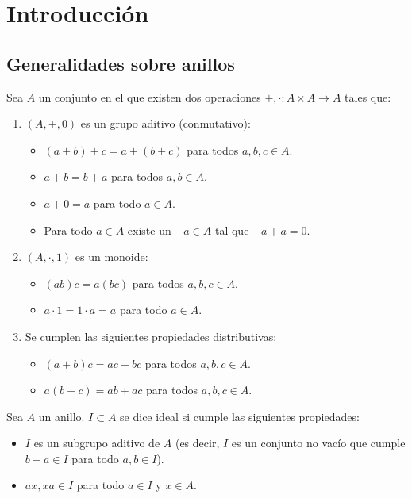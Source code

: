 \section{Introducción}
\subsection{Generalidades sobre anillos}
\begin{df}[Anillo]
  Sea \(A\) un conjunto en el que existen dos operaciones
  \(+,\cdot:A\times A\longrightarrow A\) tales que:
  \begin{enumerate}
    \item \((A, +,0)\) es un grupo aditivo (conmutativo):
      \begin{itemize}
        \item \((a+b)+c=a+(b+c)\) para todos \(a,b,c\in A\).
        \item \(a+b=b+a\) para todos \(a,b\in A\).
        \item \(a+0=a\) para todo \(a\in A\).
        \item Para todo \(a\in A\) existe un \(-a\in A\)
          tal que \(-a+a=0\).
      \end{itemize}
    \item \((A, \cdot, 1)\) es un monoide:
      \begin{itemize}
        \item \((ab)c=a(bc)\) para todos \(a,b,c\in A\).
        \item \(a\cdot 1=1\cdot a=a\) para todo \(a\in A\).
      \end{itemize}
    \item Se cumplen las siguientes propiedades distributivas:
      \begin{itemize}
        \item \((a+b)c=ac+bc\) para todos \(a,b,c\in A\).
        \item \(a(b+c)=ab+ac\) para todos \(a,b,c\in A\).
      \end{itemize}
     \end{enumerate}
  \end{df}

  \begin{df}[Ideales]
    Sea \(A\) un anillo. \(I\subset A\) se dice ideal si cumple las
    siguientes propiedades:
    \begin{itemize}
      \item \(I\) es un subgrupo aditivo de \(A\) (es decir,
        \(I\) es un conjunto no vacío que cumple
        \(b-a\in I\) para todo \(a, b\in I\)).
      \item \(ax, xa\in I\) para todo \(a\in I\) y \(x \in A\).
    \end{itemize}
  \end{df}

